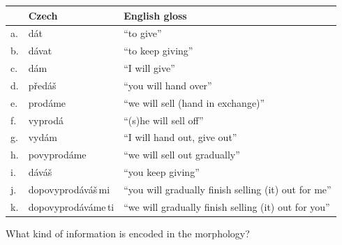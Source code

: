 \documentclass[a4paper,landscape,headrule,footrule]{foils}
\begin{document}
\begin{tabular}{lll}
 & Czech & English gloss\\
 \hline
a. &  dát & ``to give''\\
b. & dávat & ``to keep giving''\\
c. & dám & ``I will give''\\
d. & předáš & ``you will hand over''\\
e. & prodáme & ``we will sell (hand in exchange)''\\
f. & vyprodá & ``(s)he will sell off''\\
g. & vydám & ``I will hand out, give out''\\
h. & povyprodáme & ``we will sell out gradually''\\
i. & dáváš & ``you keep giving''\\
j. & dopovyprodáváš\,mi & ``you will gradually finish selling (it) out for me''\\
k. & dopovyprodáváme\,ti & ``we will gradually finish selling (it) out for you''\\
\end{tabular}

What kind of information is encoded in the morphology?




\end{document}
